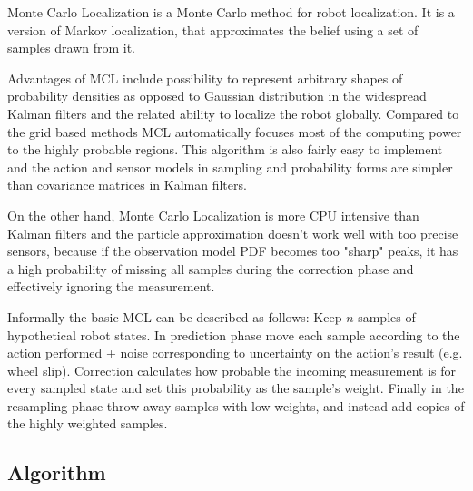 
Monte Carlo Localization \cite{dellaert99} is a Monte Carlo method for
robot localization.
It is a version of Markov localization, that approximates the belief
using a set of samples drawn from it.

Advantages of MCL include 
possibility to represent arbitrary shapes of probability densities as opposed to
Gaussian distribution in the widespread Kalman filters
and the related ability to localize the robot globally.
Compared to the grid based methods MCL automatically focuses most of the
computing power to the highly probable regions.
This algorithm is also fairly easy to implement and the action and sensor models
in sampling and probability forms are simpler than covariance matrices in
Kalman filters.

On the other hand, Monte Carlo Localization is more CPU intensive than Kalman filters
and the particle approximation doesn't work well with too precise sensors,
because if the observation model PDF becomes too "sharp" peaks, it has a high probability
of missing all samples during the correction phase and effectively ignoring the measurement.

Informally the basic MCL can be described as follows:
Keep \(n\) samples of hypothetical robot states.
In prediction phase move each sample according to the action performed + noise corresponding
to uncertainty on the action's result (e.g. wheel slip).
Correction calculates how probable the incoming measurement is
for every sampled state and set this probability as the sample's weight.
Finally in the resampling phase throw away samples with low weights, and
instead add copies of the highly weighted samples.

\subsection{Algorithm}

